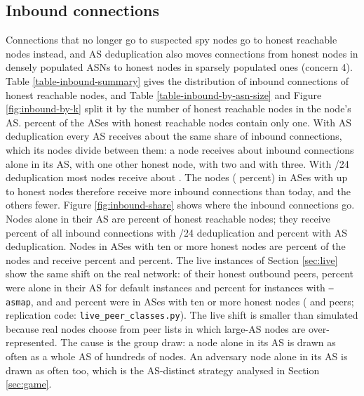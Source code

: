 \documentclass[english]{mrl}
\theoremstyle{plain}
\begin{document}


\subsection{Inbound connections\label{sec:inbound}}

Connections that no longer go to suspected spy nodes go to honest reachable nodes instead, and AS deduplication also moves connections from honest nodes in densely populated ASNs to honest nodes in sparsely populated ones (concern 4). Table \ref{table-inbound-summary} gives the distribution of inbound connections of honest reachable nodes, and Table \ref{table-inbound-by-asn-size} and Figure \ref{fig:inbound-by-k} split it by the number of honest reachable nodes in the node's AS. \ikSingleAsesPct{} percent of the ASes with honest reachable nodes contain only one. With AS deduplication every AS receives about the same share of inbound connections, which its nodes divide between them: a node receives about \inAloneAsmap{} inbound connections alone in its AS, \ikTwoAsmap{} with one other honest node, \ikThreeAsmap{} with two and \ikFourAsmap{} with three. With /24 deduplication most nodes receive about \inAloneSubnet{}. The \ikMoreNodes{} nodes (\ikMorePct{} percent) in ASes with up to \ikMoreMaxK{} honest nodes therefore receive more inbound connections than today, and the others fewer. Figure \ref{fig:inbound-share} shows where the inbound connections go. Nodes alone in their AS are \ishAloneNodes{} percent of honest reachable nodes; they receive \ishAloneMaster{} percent of all inbound connections with /24 deduplication and \ishAloneAsmap{} percent with AS deduplication. Nodes in ASes with ten or more honest nodes are \ishBigNodes{} percent of the nodes and receive \ishBigMaster{} percent and \ishBigAsmap{} percent. The live instances of Section \ref{sec:live} show the same shift on the real network: of their honest outbound peers, \lpAloneDefault{} percent were alone in their AS for default instances and \lpAloneAsmap{} percent for instances with \texttt{--asmap}, and \lpBigDefault{} and \lpBigAsmap{} percent were in ASes with ten or more honest nodes (\lpPeersDefault{} and \lpPeersAsmap{} peers; replication code: \texttt{live\_peer\_classes.py}). The live shift is smaller than simulated because real nodes choose from peer lists in which large-AS nodes are over-represented. The cause is the group draw: a node alone in its AS is drawn as often as a whole AS of hundreds of nodes. An adversary node alone in its AS is drawn as often too, which is the AS-distinct strategy analysed in Section \ref{sec:game}.
\end{document}
